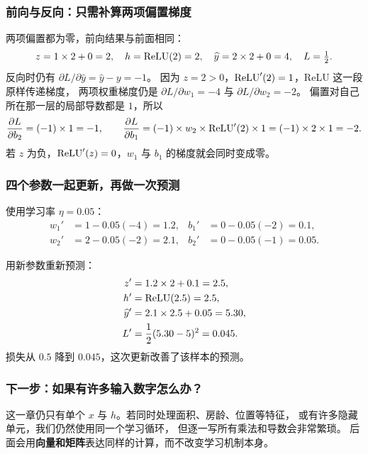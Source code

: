 \subsubsection{前向与反向：只需补算两项偏置梯度}

两项偏置都为零，前向结果与前面相同：
\[
z=1\times2+0=2,\quad h=\operatorname{ReLU}(2)=2,\quad
\widehat{y}=2\times2+0=4,\quad L=\tfrac12.
\]
反向时仍有 $\partial L/\partial\widehat{y}=\widehat{y}-y=-1$。
因为 $z=2>0$，$\operatorname{ReLU}'(2)=1$，ReLU 这一段原样传递梯度，
两项权重梯度仍是 $\partial L/\partial w_1=-4$ 与 $\partial L/\partial w_2=-2$。
偏置对自己所在那一层的局部导数都是 $1$，所以
\[
\frac{\partial L}{\partial b_2}=(-1)\times1=-1,\qquad
\frac{\partial L}{\partial b_1}=(-1)\times w_2\times\operatorname{ReLU}'(2)\times1=(-1)\times2\times1=-2.
\]
若 $z$ 为负，$\operatorname{ReLU}'(z)=0$，$w_1$ 与 $b_1$ 的梯度就会同时变成零。

\subsubsection{四个参数一起更新，再做一次预测}

使用学习率 $\eta=0.05$：
\[\begin{aligned}
w_1'&=1-0.05(-4)=1.2,&
b_1'&=0-0.05(-2)=0.1,\\
w_2'&=2-0.05(-2)=2.1,&
b_2'&=0-0.05(-1)=0.05.
\end{aligned}\]

用新参数重新预测：
\[\begin{aligned}
z'&=1.2\times2+0.1=2.5,\\
h'&=\operatorname{ReLU}(2.5)=2.5,\\
\widehat{y}'&=2.1\times2.5+0.05=5.30,\\
L'&=\frac12(5.30-5)^2=0.045.
\end{aligned}\]
损失从 $0.5$ 降到 $0.045$，这次更新改善了该样本的预测。

\subsubsection{下一步：如果有许多输入数字怎么办？}

这一章仍只有单个 $x$ 与 $h$。若同时处理面积、房龄、位置等特征，
或有许多隐藏单元，我们仍然使用同一个学习循环，
但逐一写所有乘法和导数会非常繁琐。
后面会用\textbf{向量和矩阵}表达同样的计算，而不改变学习机制本身。

